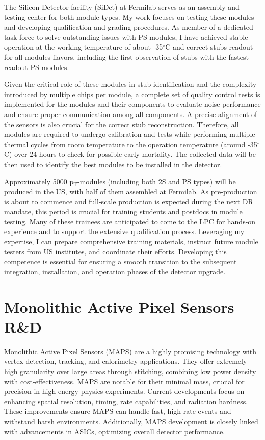 {\begin{flushleft}
The Silicon Detector facility (SiDet) at Fermilab serves as an assembly and testing center for both module types. My work focuses on testing these modules and developing qualification and grading procedures. As member of a dedicated task force to solve outstanding issues with PS modules, I have achieved stable operation at the working temperature of about -35$^{\circ}$C and correct stubs readout for all modules flavors, including the first observation of stubs with the fastest readout PS modules.

Given the critical role of these modules in stub identification and the complexity introduced by multiple chips per module, a complete set of quality control tests is implemented for the modules and their components to evaluate noise performance and ensure proper communication among all components. A precise alignment of the sensors is also crucial for the correct stub reconstruction. Therefore, all modules are required to undergo calibration and tests while performing multiple thermal cycles from room temperature to the operation temperature (around -35$^{\circ}$C) over 24 hours to check for possible early mortality. The collected data will be then used to identify the best modules to be installed in the detector.
 
Approximately 5000 p$_{\mathrm{T}}$-modules (including both 2S and PS types) will be produced in the US, with half of them assembled at Fermilab. As pre-production is about to commence and full-scale production is expected during the next DR mandate, this period is crucial for training students and postdocs in module testing. Many of these trainees are anticipated to come to the LPC for hands-on experience and to support the extensive qualification process.
Leveraging my expertise, I can prepare comprehensive training materials, instruct future module testers from US institutes, and coordinate their efforts. Developing this competence is essential for ensuring a smooth transition to the subsequent integration, installation, and operation phases of the detector upgrade.

\vspace{\baselineskip}
\section{Monolithic Active Pixel Sensors R\&D}
\vspace{\baselineskip}
Monolithic Active Pixel Sensors (MAPS) are a highly promising technology with vertex detection, tracking, and calorimetry applications. They offer extremely high granularity over large areas through stitching, combining low power density with cost-effectiveness. MAPS are notable for their minimal mass, crucial for precision in high-energy physics experiments.
Current developments focus on enhancing spatial resolution, timing, rate capabilities, and radiation hardness. These improvements ensure MAPS can handle fast, high-rate events and withstand harsh environments. Additionally, MAPS development is closely linked with advancements in ASICs, optimizing overall detector performance.


\end{flushleft}}
